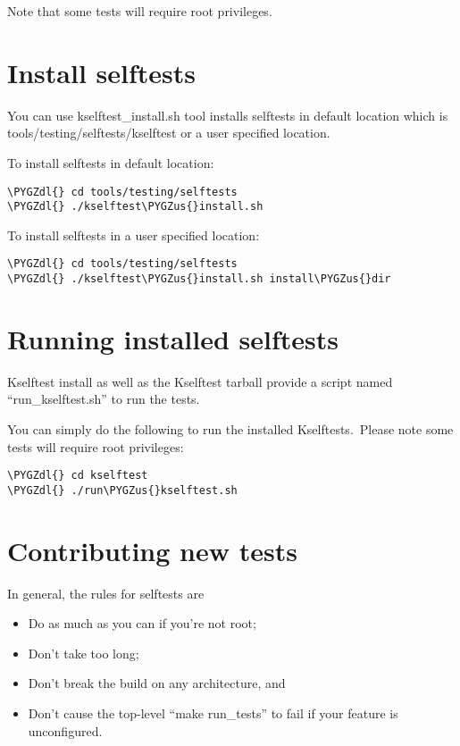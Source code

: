 \documentclass[a4paper,8pt,english]{sphinxmanual}
\def\PYGZus{\char`\_}
\def\PYGZdl{\char`\$}
\begin{document}
Note that some tests will require root privileges.


\section{Install selftests}
\label{dev-tools/kselftest:install-selftests}
You can use kselftest\_install.sh tool installs selftests in default
location which is tools/testing/selftests/kselftest or a user specified
location.

To install selftests in default location:

\begin{Verbatim}[commandchars=\\\{\}]
\PYGZdl{} cd tools/testing/selftests
\PYGZdl{} ./kselftest\PYGZus{}install.sh
\end{Verbatim}

To install selftests in a user specified location:

\begin{Verbatim}[commandchars=\\\{\}]
\PYGZdl{} cd tools/testing/selftests
\PYGZdl{} ./kselftest\PYGZus{}install.sh install\PYGZus{}dir
\end{Verbatim}


\section{Running installed selftests}
\label{dev-tools/kselftest:running-installed-selftests}
Kselftest install as well as the Kselftest tarball provide a script
named ``run\_kselftest.sh'' to run the tests.

You can simply do the following to run the installed Kselftests. Please
note some tests will require root privileges:

\begin{Verbatim}[commandchars=\\\{\}]
\PYGZdl{} cd kselftest
\PYGZdl{} ./run\PYGZus{}kselftest.sh
\end{Verbatim}


\section{Contributing new tests}
\label{dev-tools/kselftest:contributing-new-tests}
In general, the rules for selftests are
\begin{itemize}
\item {} 
Do as much as you can if you're not root;

\item {} 
Don't take too long;

\item {} 
Don't break the build on any architecture, and

\item {} 
Don't cause the top-level ``make run\_tests'' to fail if your feature is
unconfigured.

\end{itemize}
\end{document}
